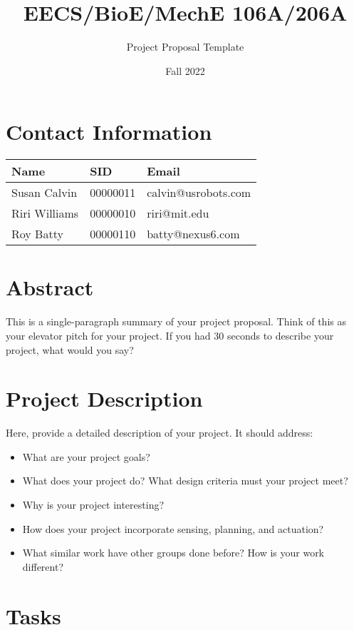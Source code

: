 \documentclass[letterpaper]{article}
\title{\textbf{EECS/BioE/MechE 106A/206A}}
\author{Project Proposal Template} %
\date{Fall 2022}
\begin{document}
\maketitle

\section{Contact Information}


\begin{tabular}[h]{l|l|l}
\textbf{Name} & \textbf{SID} & \textbf{Email} \\
\hline
Susan Calvin & 00000011 & calvin@usrobots.com \\
Riri Williams & 00000010 & riri@mit.edu \\
Roy Batty & 00000110 & batty@nexus6.com \\
\end{tabular}

\section{Abstract}

This is a single-paragraph summary of your project proposal. Think of this as your elevator pitch for your project. If you had 30 seconds to describe your project, what would you say?

\section{Project Description}

Here, provide a detailed description of your project. It should address:

\begin{itemize}
\item What are your project goals?
\item What does your project do? What design criteria must your project meet?
\item Why is your project interesting?
\item How does your project incorporate sensing, planning, and actuation?
\item What similar work have other groups done before? How is your work different?
\end{itemize}

\section{Tasks}
\end{document}
